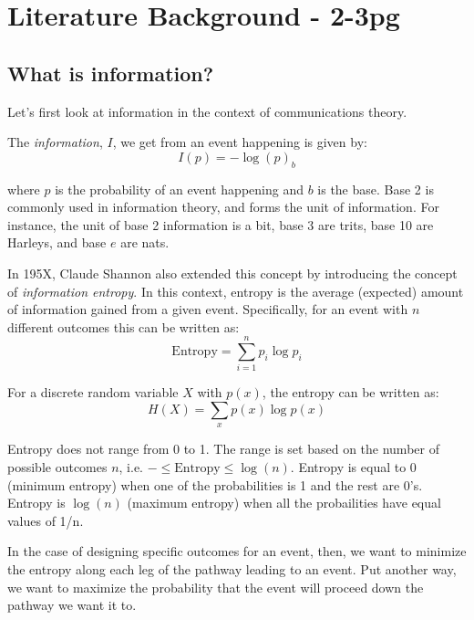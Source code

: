 \section{Literature Background - 2-3pg}

\subsection{What is information?}

Let's first look at information in the context of communications theory.

The \textit{information}, $I$, we get from an event happening is given by:
\begin{equation}
I(p) = -\log{(p)}_b
\end{equation}

where $p$ is the probability of an event happening and $b$ is the base.
Base 2 is commonly used in information theory, and forms the unit of information.
For instance, the unit of base 2 information is a bit, base 3 are trits, base 10 are Harleys, and base $e$ are nats.

In 195X, Claude Shannon also extended this concept by introducing the concept of \textit{information entropy}.
In this context, entropy is the average (expected) amount of information gained from a given event.
Specifically, for an event with $n$ different outcomes this can be written as:
\begin{equation}
\text{Entropy} = \sum_{i=1}^{n}p_i\log{p_i}
\end{equation} 

For a discrete random variable $X$ with $p(x)$, the entropy can be written as:
\begin{equation}
H(X) = \sum_x p(x)\log{p(x)}
\end{equation}


Entropy does not range from 0 to 1.
The range is set based on the number of possible outcomes $n$, i.e. $-\leq\text{Entropy}\leq\log{(n)}$.
Entropy is equal to 0 (minimum entropy) when one of the probabilities is 1 and the rest are 0's.
Entropy is $\log{(n)}$ (maximum entropy) when all the probailities have equal values of 1/n.

In the case of designing specific outcomes for an event, then, we want to minimize the entropy along each leg of the pathway leading to an event.
Put another way, we want to maximize the probability that the event will proceed down the pathway we want it to.

